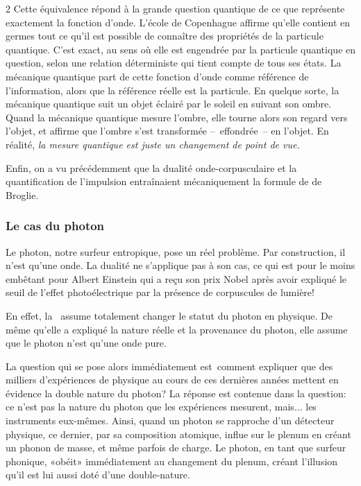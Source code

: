 \begin{multicols}{2}
Cette équivalence répond à la grande question quantique de ce que
représente exactement la fonction d'onde. L'école de Copenhague
affirme qu'elle contient en germes tout ce qu'il est possible de
connaître des propriétés de la particule quantique. C'est exact, au
sens où elle est engendrée par la particule quantique en question,
selon une relation déterministe qui tient compte de tous ses états. La
mécanique quantique part de cette fonction d'onde comme
référence de l'information, alors que la référence réelle est la
particule. En quelque sorte, la mécanique quantique suit un objet
éclairé par le soleil en suivant son ombre. Quand la mécanique
quantique mesure l'ombre, elle tourne alors son regard vers l'objet,
et affirme que l'ombre s'est transformée --~effondrée~-- en l'objet.
En réalité, \textit{la mesure quantique est juste un changement de point de
vue.}

Enfin, on a vu précédemment que la dualité onde-corpusculaire et la
quantification de l'impulsion entraînaient mécaniquement la formule de
de Broglie.

\subsubsection{Le cas du photon}

Le photon, notre surfeur entropique, pose un réel problème. Par
construction, il n'est qu'une onde. La dualité ne s'applique pas à son
cas, ce qui est pour le moins embêtant pour Albert Einstein qui a reçu
son prix Nobel après avoir expliqué le seuil de l'effet
photoélectrique par la présence de corpuscules de lumière!

En effet, la \PQ\ assume totalement changer le statut du photon en
physique. De même qu'elle a expliqué la nature réelle et la provenance
du photon, elle assume que le photon n'est qu'une onde pure.

La question qui se pose alors immédiatement est comment expliquer que
des milliers d'expériences de physique au cours de ces dernières
années mettent en évidence la double nature du photon? La réponse est
contenue dans la question: ce n'est pas la nature du photon que les
expériences mesurent, mais$\ldots$ les instruments eux-mêmes. Ainsi, quand
un photon se rapproche d'un détecteur physique, ce dernier, par sa composition
atomique, influe sur le plenum en créant un phonon de
masse, et même parfois de charge. Le photon, en tant que surfeur
phonique, «obéit» immédiatement au changement du plenum, créant
l'illusion qu'il est lui aussi doté d'une double-nature.


\end{multicols}
